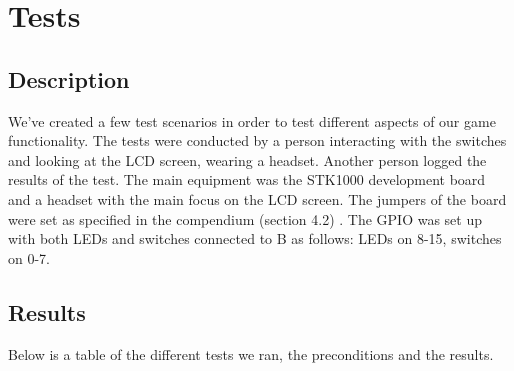 \documentclass[a4paper,11pt]{article}
\begin{document}
\section{Tests}
\subsection{Description}

We've created a few test scenarios in order to test different aspects of our game functionality. The tests were conducted by a person interacting with the switches and looking at the LCD screen, wearing a headset. Another person logged the results of the test. The main equipment was the STK1000 development board and a headset with the main focus on the LCD screen. The jumpers of the board were set as specified in the compendium (section 4.2) \cite{komp}. The GPIO was set up with both LEDs and switches connected to B as follows: LEDs on 8-15, switches on 0-7. 

\subsection{Results}
Below is a table of the different tests we ran, the preconditions and the results. 
\end{document}
